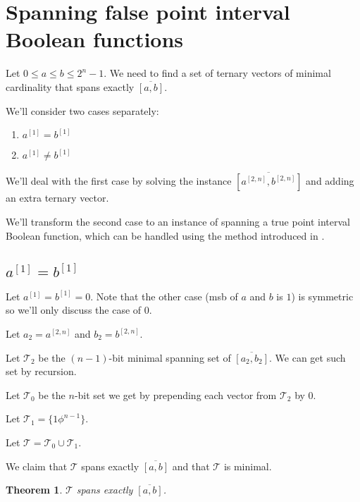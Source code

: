 \documentclass{article}
\theoremstyle{plain}
\newtheorem{theorem}{Theorem}[subsection]
\theoremstyle{definition}
\newcommand{\interval}[2]{[#1, #2]}
\newcommand{\finterval}[2]{\overline{\interval{#1}{#2}}}
\newcommand{\bit}[2]{#1^{[#2]}}
\newcommand{\bits}[3]{#1^{\interval{#2}{#3}}}
\begin{document}
\section{Spanning false point interval Boolean functions}
Let $0 \leq a \leq b \leq 2^n - 1$.
We need to find a set of ternary vectors of minimal cardinality that spans exactly $\finterval{a}{b}$.

We'll consider two cases separately:

\begin{enumerate}
\item $\bit{a}{1} = \bit{b}{1}$
\item $\bit{a}{1} \neq \bit{b}{1}$
\end{enumerate}

We'll deal with the first case by solving the instance $\finterval{\bits{a}{2}{n}}{\bits{b}{2}{n}}$
and adding an extra ternary vector.

We'll transform the second case to an instance of spanning a true point interval Boolean function,
which can be handled using the method introduced in \cite{Schieber2005154}.

\subsection{$\bit{a}{1} = \bit{b}{1}$}
Let $\bit{a}{1} = \bit{b}{1} = 0$.
Note that the other case (\acrshort{msb} of $a$ and $b$ is $1$)
is symmetric so we'll only discuss the case of $0$.

Let $a_2 = \bits{a}{2}{n}$ and $b_2 = \bits{b}{2}{n}$.

Let $\mathcal{T}_2$ be the $(n-1)$-bit minimal spanning set of $\finterval{a_2}{b_2}$.
We can get such set by recursion.

Let $\mathcal{T}_0$ be the $n$-bit set we get by prepending each vector from $\mathcal{T}_2$ by $0$.

Let $\mathcal{T}_1 = \{ 1 \phi^{n-1} \}$.

Let $\mathcal{T} = \mathcal{T}_0 \cup \mathcal{T}_1$.

We claim that $\mathcal{T}$ spans exactly $\finterval{a}{b}$
and that $\mathcal{T}$ is minimal.

\begin{theorem}
$\mathcal{T}$ spans exactly $\finterval{a}{b}$.
\end{theorem}
\end{document}
